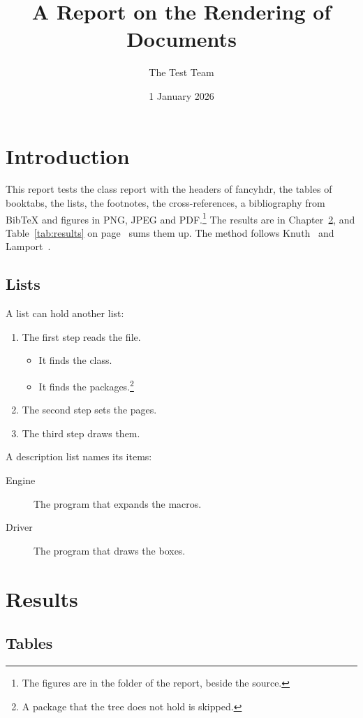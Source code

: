 \documentclass[11pt]{report}
\title{A Report on the Rendering of Documents}
\author{The Test Team}
\date{1 January 2026}
\begin{document}
\maketitle
\tableofcontents

\chapter{Introduction}\label{ch:intro}

This report tests the class report with the headers of fancyhdr, the
tables of booktabs, the lists, the footnotes, the cross-references, a
bibliography from BibTeX and figures in PNG, JPEG and PDF.\footnote{The
figures are in the folder of the report, beside the source.} The results
are in Chapter~\ref{ch:results}, and Table~\ref{tab:results} on
page~\pageref{tab:results} sums them up. The method follows
Knuth~\cite{knuth84} and Lamport~\cite{lamport94}.

\section{Lists}

A list can hold another list:
\begin{enumerate}
  \item The first step reads the file.
  \begin{itemize}
    \item It finds the class.
    \item It finds the packages.\footnote{A package that the tree does not
      hold is skipped.}
  \end{itemize}
  \item The second step sets the pages.
  \item The third step draws them.
\end{enumerate}
A description list names its items:
\begin{description}
  \item[Engine] The program that expands the macros.
  \item[Driver] The program that draws the boxes.
\end{description}

\chapter{Results}\label{ch:results}

\section{Tables}
\end{document}

